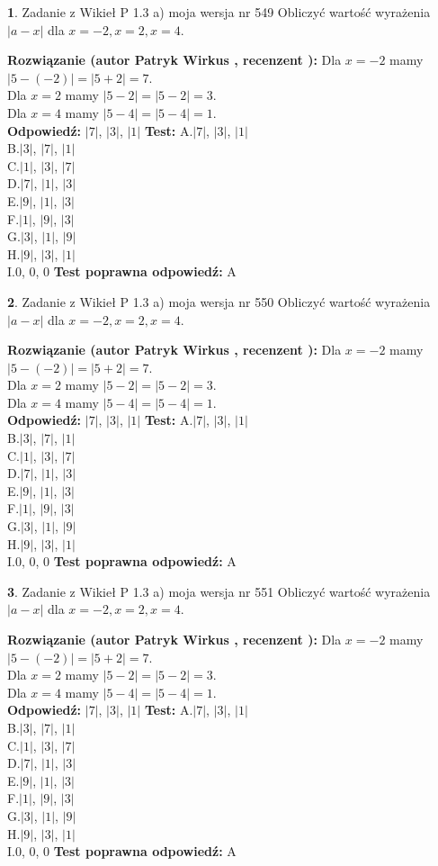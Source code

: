 \documentclass[12pt, a4paper]{article}
\theoremstyle{definition} %
\newtheorem{zad}{}
\newcommand{\zadStart}[1]{\begin{zad}#1\newline}
\newcommand{\zadStop}{\end{zad}}
\newcommand{\rozwStart}[2]{\noindent \textbf{Rozwiązanie (autor #1 , recenzent #2): }\newline}
\newcommand{\rozwStop}{\newline}
\newcommand{\odpStart}{\noindent \textbf{Odpowiedź:}\newline}
\newcommand{\odpStop}{\newline}
\newcommand{\testStart}{\noindent \textbf{Test:}\newline}
\newcommand{\testStop}{\newline}
\newcommand{\kluczStart}{\noindent \textbf{Test poprawna odpowiedź:}\newline}
\newcommand{\kluczStop}{\newline}
\begin{document}
\zadStart{Zadanie z Wikieł P 1.3 a) moja wersja nr 549}
Obliczyć wartość wyrażenia $|a - x|$ dla $x=-2,x=2,x=4$.
\zadStop
\rozwStart{Patryk Wirkus}{}
Dla $x = -2$ mamy $|5 - (-2)| = |5 + 2| = 7$.\\
Dla $x = 2$ mamy $|5 - 2| = |5 - 2| = 3$.\\
Dla $x = 4$ mamy $|5 - 4| = |5 - 4| = 1$.\\
\rozwStop
\odpStart
$|7|$, $|3|$, $|1|$
\odpStop
\testStart
A.$|7|$, $|3|$, $|1|$\\
B.$|3|$, $|7|$, $|1|$\\
C.$|1|$, $|3|$, $|7|$\\
D.$|7|$, $|1|$, $|3|$\\
E.$|9|$, $|1|$, $|3|$\\
F.$|1|$, $|9|$, $|3|$\\
G.$|3|$, $|1|$, $|9|$\\
H.$|9|$, $|3|$, $|1|$\\
I.$0$, $0$, $0$
\testStop
\kluczStart
A
\kluczStop



\zadStart{Zadanie z Wikieł P 1.3 a) moja wersja nr 550}
Obliczyć wartość wyrażenia $|a - x|$ dla $x=-2,x=2,x=4$.
\zadStop
\rozwStart{Patryk Wirkus}{}
Dla $x = -2$ mamy $|5 - (-2)| = |5 + 2| = 7$.\\
Dla $x = 2$ mamy $|5 - 2| = |5 - 2| = 3$.\\
Dla $x = 4$ mamy $|5 - 4| = |5 - 4| = 1$.\\
\rozwStop
\odpStart
$|7|$, $|3|$, $|1|$
\odpStop
\testStart
A.$|7|$, $|3|$, $|1|$\\
B.$|3|$, $|7|$, $|1|$\\
C.$|1|$, $|3|$, $|7|$\\
D.$|7|$, $|1|$, $|3|$\\
E.$|9|$, $|1|$, $|3|$\\
F.$|1|$, $|9|$, $|3|$\\
G.$|3|$, $|1|$, $|9|$\\
H.$|9|$, $|3|$, $|1|$\\
I.$0$, $0$, $0$
\testStop
\kluczStart
A
\kluczStop



\zadStart{Zadanie z Wikieł P 1.3 a) moja wersja nr 551}
Obliczyć wartość wyrażenia $|a - x|$ dla $x=-2,x=2,x=4$.
\zadStop
\rozwStart{Patryk Wirkus}{}
Dla $x = -2$ mamy $|5 - (-2)| = |5 + 2| = 7$.\\
Dla $x = 2$ mamy $|5 - 2| = |5 - 2| = 3$.\\
Dla $x = 4$ mamy $|5 - 4| = |5 - 4| = 1$.\\
\rozwStop
\odpStart
$|7|$, $|3|$, $|1|$
\odpStop
\testStart
A.$|7|$, $|3|$, $|1|$\\
B.$|3|$, $|7|$, $|1|$\\
C.$|1|$, $|3|$, $|7|$\\
D.$|7|$, $|1|$, $|3|$\\
E.$|9|$, $|1|$, $|3|$\\
F.$|1|$, $|9|$, $|3|$\\
G.$|3|$, $|1|$, $|9|$\\
H.$|9|$, $|3|$, $|1|$\\
I.$0$, $0$, $0$
\testStop
\kluczStart
A
\kluczStop
\end{document}
